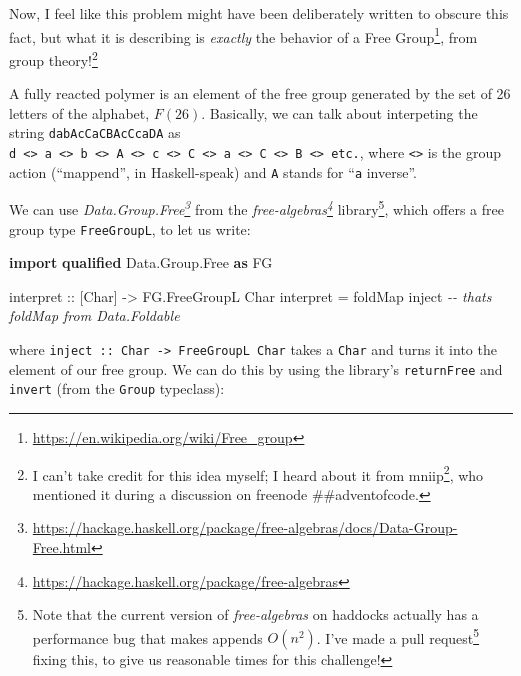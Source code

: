 \documentclass[]{article}
\newenvironment{Shaded}{}{}
\newcommand{\CommentTok}[1]{\textcolor[rgb]{0.38,0.63,0.69}{\textit{#1}}}
\newcommand{\DataTypeTok}[1]{\textcolor[rgb]{0.56,0.13,0.00}{#1}}
\newcommand{\FunctionTok}[1]{\textcolor[rgb]{0.02,0.16,0.49}{#1}}
\newcommand{\KeywordTok}[1]{\textcolor[rgb]{0.00,0.44,0.13}{\textbf{#1}}}
\newcommand{\NormalTok}[1]{#1}
\newcommand{\OtherTok}[1]{\textcolor[rgb]{0.00,0.44,0.13}{#1}}
\renewcommand{\href}[2]{#2\footnote{\url{#1}}}
\begin{document}
Now, I feel like this problem might have been deliberately written to obscure
this fact, but what it is describing is \emph{exactly} the behavior of a
\href{https://en.wikipedia.org/wiki/Free_group}{Free Group}, from group
theory!\footnote{I can't take credit for this idea myself; I heard about it from
  \href{http://mniip.com/}{mniip}, who mentioned it during a discussion on
  freenode \#\#adventofcode.}

A fully reacted polymer is an element of the free group generated by the set of
26 letters of the alphabet, \(F(26)\). Basically, we can talk about interpeting
the string \texttt{dabAcCaCBAcCcaDA} as
\texttt{d\ \textless{}\textgreater{}\ a\ \textless{}\textgreater{}\ b\ \textless{}\textgreater{}\ A\ \textless{}\textgreater{}\ c\ \textless{}\textgreater{}\ C\ \textless{}\textgreater{}\ a\ \textless{}\textgreater{}\ C\ \textless{}\textgreater{}\ B\ \textless{}\textgreater{}\ etc.},
where \texttt{\textless{}\textgreater{}} is the group action (``mappend'', in
Haskell-speak) and \texttt{A} stands for ``\texttt{a} inverse''.

We can use
\emph{\href{https://hackage.haskell.org/package/free-algebras/docs/Data-Group-Free.html}{Data.Group.Free}}
from the
\emph{\href{https://hackage.haskell.org/package/free-algebras}{free-algebras}}
library\footnote{Note that the current version of \emph{free-algebras} on
  haddocks actually has a performance bug that makes appends \(O(n^2)\). I've
  made a \href{https://github.com/coot/free-algebras/pull/4}{pull request}
  fixing this, to give us reasonable times for this challenge!}, which offers a
free group type \texttt{FreeGroupL}, to let us write:

\begin{Shaded}
\begin{Highlighting}[]
\KeywordTok{import} \KeywordTok{qualified} \DataTypeTok{Data.Group.Free} \KeywordTok{as} \DataTypeTok{FG}

\OtherTok{interpret ::}\NormalTok{ [}\DataTypeTok{Char}\NormalTok{] }\OtherTok{{-}\textgreater{}} \DataTypeTok{FG.FreeGroupL} \DataTypeTok{Char}
\NormalTok{interpret }\OtherTok{=} \FunctionTok{foldMap}\NormalTok{ inject          }\CommentTok{{-}{-} that\textquotesingle{}s \textasciigrave{}foldMap\textasciigrave{} from Data.Foldable}
\end{Highlighting}
\end{Shaded}

where \texttt{inject\ ::\ Char\ -\textgreater{}\ FreeGroupL\ Char} takes a
\texttt{Char} and turns it into the element of our free group. We can do this by
using the library's \texttt{returnFree} and \texttt{invert} (from the
\texttt{Group} typeclass):
\end{document}
